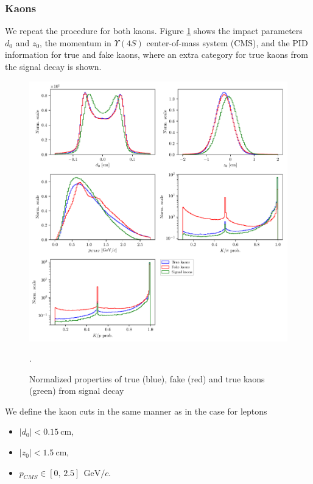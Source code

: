\documentclass[oneside,a4paper,openany,12pt]{scrbook}
\newcommand {\e}[1]{\mathrm{~#1}}
\begin{document}
\subsubsection{Kaons}

We repeat the procedure for both kaons. Figure \ref{fig:Kvars} shows the impact parameters $d_0$ and $z_0$, the momentum in  $\Upsilon(4S)$ center-of-mass system (CMS), and the PID information for true and fake kaons, where an extra category for true kaons from the signal decay is shown.

\begin{figure}[H]
\centering
\includegraphics[width=\linewidth]{fig/FSP_kaon_vars}
\captionsetup{width=.8\linewidth}
\caption{Normalized properties of true (blue), fake (red) and true kaons (green) from signal decay}.
\label{fig:Kvars}
\end{figure}

We define the kaon cuts in the same manner as in the case for leptons
\begin{itemize}
\item $\vert d_0 \vert < 0.15\e{cm}$,
\item $\vert z_0 \vert < 1.5\e{cm}$,
\item $p_{CMS} \in [0,\,2.5]~\e{GeV}/c$.
\end{itemize}
\end{document}
